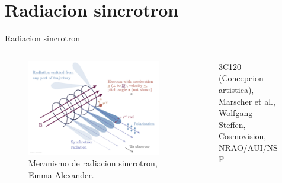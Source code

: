 \documentclass[xetex,aspectratio=169]{beamer}
\begin{document}
	\section{Radiacion sincrotron}
	\begin{frame}{Radiacion sincrotron}
		\begin{columns}
			
			\begin{column}{0.48\textwidth}
				\begin{figure}
					\includegraphics[width=\textwidth, keepaspectratio]{./figures/synchrotron/synchrotron.png}
					\caption{Mecanismo de radiacion sincrotron, Emma Alexander.}
				\end{figure}
			\end{column}
			
			\begin{column}{0.48\textwidth}
				\begin{figure}
					\caption{3C120 (Concepcion artistica), Marscher et al., Wolfgang Steffen, Cosmovision, NRAO/AUI/NSF}
				\end{figure}
				
				
			\end{column}
		\end{columns}
	\end{frame}
	
\end{document}
